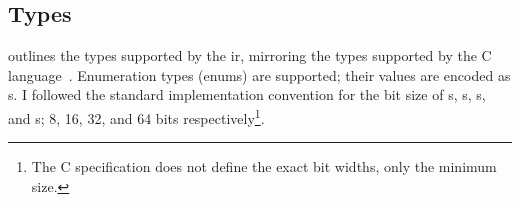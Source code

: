 \documentclass[00-main.tex]{subfiles}
\begin{document}
%
%
%

\subsection{Types}

 outlines the types supported by the \gls{ir}, mirroring the types supported by the C language~.
Enumeration types (enums) are supported; their values are encoded as s.
I followed the standard implementation convention for the bit size of s, s, s, and s; 8, 16, 32, and 64 bits respectively\footnote{The C specification does not define the exact bit widths, only the minimum size.}.
\end{document}

